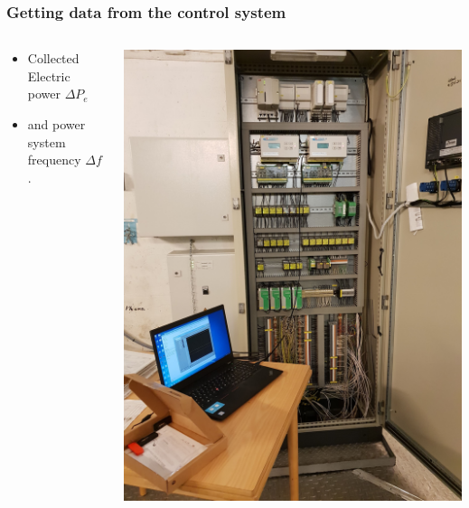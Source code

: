\begin{frame}
	\frametitle{Getting data from the control system}
	\begin{columns}
		\begin{column}{0.3\textwidth}
			\begin{itemize}
				\item Collected Electric power $\Delta P_e$
				\item and power system frequency $\Delta f$.
			\end{itemize}
		\end{column}
		\begin{column}{0.7\textwidth}
			\includegraphics[angle=-90, origin= c, height=\textheight]{./pictures/hymatek.jpg}
		\end{column}
	\end{columns}
\end{frame}
